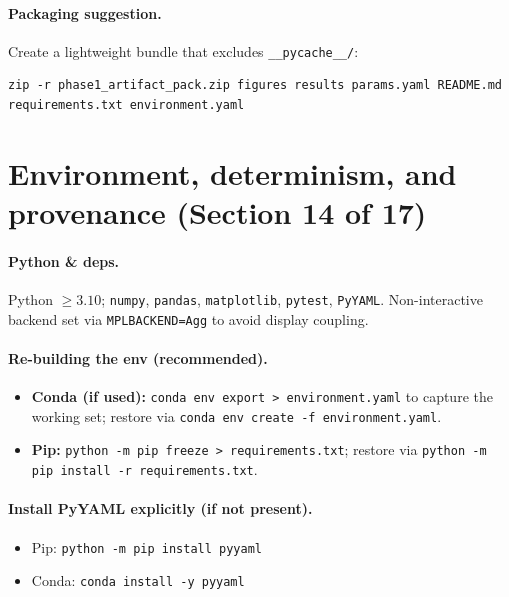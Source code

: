 \documentclass[12pt,a4paper]{article}
\newcommand{\code}[1]{\texttt{#1}}
\begin{document}
\paragraph{Packaging suggestion.}
Create a lightweight bundle that excludes \texttt{\_\_pycache\_\_/}:

\begin{Verbatim}[breaklines,breakanywhere,fontsize=\small]
zip -r phase1_artifact_pack.zip figures results params.yaml README.md requirements.txt environment.yaml
\end{Verbatim}



\section{Environment, determinism, and provenance (Section 14 of 17)}
\paragraph{Python \& deps.} Python $\ge 3.10$; \code{numpy}, \code{pandas}, \code{matplotlib}, \code{pytest}, \code{PyYAML}. Non-interactive backend set via \code{MPLBACKEND=Agg} to avoid display coupling.

\paragraph{Re-building the env (recommended).}
\begin{itemize}[leftmargin=1.25em]
  \item \textbf{Conda (if used):} \code{conda env export > environment.yaml} to capture the working set; restore via \code{conda env create -f environment.yaml}.
  \item \textbf{Pip:} \code{python -m pip freeze > requirements.txt}; restore via \code{python -m pip install -r requirements.txt}.
\end{itemize}

\paragraph{Install PyYAML explicitly (if not present).}
\begin{itemize}[leftmargin=1.25em]
  \item Pip: \code{python -m pip install pyyaml}
  \item Conda: \code{conda install -y pyyaml}
\end{itemize}
\end{document}
